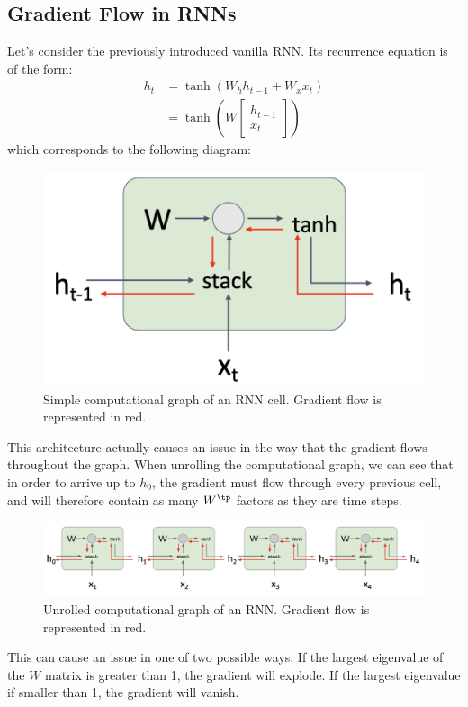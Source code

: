 \subsection{Gradient Flow in RNNs}
Let's consider the previously introduced vanilla RNN. Its recurrence equation is of the form:
\begin{equation*}
    \begin{aligned}
        h_t &= \tanh\left(W_hh_{t-1}+W_xx_t\right)\\
        &= \tanh\left(W\begin{bmatrix}
            h_{t-1}\\
            x_t
        \end{bmatrix}\right)
    \end{aligned}
\end{equation*}
which corresponds to the following diagram:
\begin{figure}[H]
    \centering
    \includegraphics[width=.5\textwidth]{images/rnn-backprop.png}
    \caption{Simple computational graph of an RNN cell. Gradient flow is represented in red.}
\end{figure}
This architecture actually causes an issue in the way that the gradient flows throughout the graph. When unrolling the computational graph, we can see that in order to arrive up to $h_0$, the gradient must flow through every previous cell, and will therefore contain as many $W^\tp$ factors as they are time steps.
\begin{figure}[H]
    \centering
    \includegraphics[width=\textwidth]{images/rnn-flow-unroll.png}
    \caption{Unrolled computational graph of an RNN. Gradient flow is represented in red.}
\end{figure}
This can cause an issue in one of two possible ways. If the largest eigenvalue of the $W$ matrix is greater than 1, the gradient will explode. If the largest eigenvalue if smaller than 1, the gradient will vanish.

